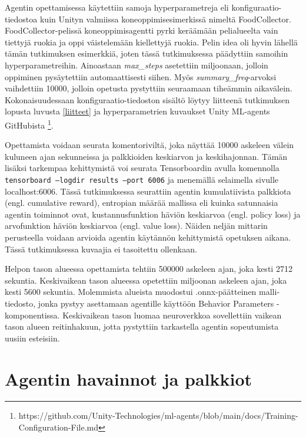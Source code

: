 \documentclass[utf8]{gradu3}
\begin{document}
Agentin opettamisessa käytettiin samoja hyperparametreja eli konfiguraatio-tiedostoa kuin Unityn valmiissa koneoppimisesimerkissä nimeltä FoodCollector. FoodCollector-pelissä koneoppimisagentti pyrki keräämään pelialueelta vain tiettyjä ruokia ja oppi väistelemään kiellettyjä ruokia. Pelin idea oli hyvin lähellä tämän tutkimuksen esimerkkiä, joten tässä tutkimuksessa päädyttiin samoihin hyperparametreihin. Ainoastaan \textit{max\_steps} asetettiin miljoonaan, jolloin oppiminen pysäytettiin automaattisesti siihen. Myös \textit{summary\_freq}-arvoksi vaihdettiin 10000, jolloin opetusta pystyttiin seuraamaan tiheämmin aikavälein. Kokonaisuudessaan konfiguraatio-tiedoston sisältö löytyy liitteenä tutkimuksen lopusta luvusta \ref{liitteet} ja hyperparametrien kuvaukset Unity ML-agents GitHubista \footnote{https://github.com/Unity-Technologies/ml-agents/blob/main/docs/Training-Configuration-File.md}.

Opettamista voidaan seurata komentoriviltä, joka näyttää 10000 askeleen välein kuluneen ajan sekunneissa ja palkkioiden keskiarvon ja keskihajonnan. Tämän lisäksi tarkempaa kehittymistä voi seurata Tensorboardin avulla komennolla \texttt{tensorboard --logdir results --port 6006} ja menemällä selaimella sivulle localhost:6006. Tässä tutkimuksessa seurattiin agentin kumulatiivista palkkiota (engl. cumulative reward), entropian määrää mallissa eli kuinka satunnaisia agentin toiminnot ovat, kustannusfunktion häviön keskiarvoa (engl. policy loss) ja arvofunktion häviön keskiarvoa (engl. value loss). Näiden neljän mittarin perusteella voidaan arvioida agentin käytännön kehittymistä opetuksen aikana. Tässä tutkimuksessa kuvaajia ei tasoitettu ollenkaan.

Helpon tason alueessa opettamista tehtiin 500000 askeleen ajan, joka kesti 2712 sekuntia. Keskivaikean tason alueessa opetettiin miljoonan askeleen ajan, joka kesti 5600 sekuntia. Molemmista alueista muodostui .onnx-päätteinen malli-tiedosto, jonka pystyy asettamaan agentille käyttöön Behavior Parameters -komponentissa. Keskivaikean tason luomaa neuroverkkoa sovellettiin vaikean tason alueen reitinhakuun, jotta pystyttiin tarkastella agentin sopeutumista uusiin esteisiin.

\section{Agentin havainnot ja palkkiot}
\end{document}

